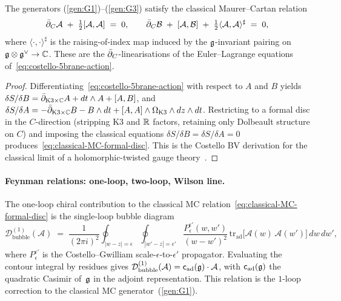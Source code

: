 \begin{proposition}
\label{prop:classical-MC-relations}
The generators
\textup{(\ref{gen:G1})--(\ref{gen:G3})} satisfy the classical
Maurer--Cartan relation
\begin{equation}
\label{eq:classical-MC-formal-disc}
\bar\partial_C \mathcal A
\;+\;
\tfrac12[\mathcal A,\mathcal A]
\;=\;
0,
\qquad
\bar\partial_C \mathcal B
\;+\;
[\mathcal A,\mathcal B]
\;+\;
\tfrac12\langle \mathcal A,\mathcal A\rangle^\sharp
\;=\;
0,
\end{equation}
where $\langle\cdot,\cdot\rangle^\sharp$ is the raising-of-index map
induced by the $\mathfrak g$-invariant pairing on $\mathfrak g\otimes\mathfrak g^\vee\to\mathbb C$.
These are the $\bar\partial_C$-linearisations of the Euler--Lagrange
equations of~\eqref{eq:costello-5brane-action}.
\end{proposition}

\begin{proof}[Proof]
Differentiating~\eqref{eq:costello-5brane-action} with respect to
$A$ and $B$ yields $\delta S/\delta B = \bar\partial_{\mathrm{K3}\times\mathbb C}A +
dt\wedge A + [A,B]$, and $\delta S/\delta A = -\bar\partial_{\mathrm{K3}\times\mathbb C}B
- B\wedge dt + [A,A]\wedge\Omega_{\mathrm{K3}}\wedge dz\wedge dt$.
Restricting to a formal disc in the $C$-direction (stripping K3 and
$\mathbb R$ factors, retaining only Dolbeault structure on $C$) and imposing
the classical equations $\delta S/\delta B = \delta S/\delta A = 0$
produces~\eqref{eq:classical-MC-formal-disc}. This is the Costello
BV derivation for the classical limit of a holomorphic-twisted gauge
theory~\cite[\S9]{costello-renormalization}.
\end{proof}

\paragraph{Feynman relations: one-loop, two-loop, Wilson line.}

\begin{proposition}
\label{prop:one-loop-bubble-relation}
The one-loop chiral contribution to the classical MC
relation~\eqref{eq:classical-MC-formal-disc} is the single-loop
bubble diagram
\begin{equation}
\label{eq:one-loop-bubble}
\mathcal D^{(1)}_{\mathrm{bubble}}(\mathcal A)
\;=\;
\frac{1}{(2\pi i)^2}
\oint_{|w-z|=\epsilon}
\oint_{|w'-z|=\epsilon'}
\frac{P_\epsilon^{\epsilon'}(w,w')}{(w-w')^2}\,
\mathrm{tr}_{\mathrm{ad}}\bigl[\mathcal A(w)\,\mathcal A(w')\bigr]\,
dw\,dw',
\end{equation}
where $P_\epsilon^{\epsilon'}$ is the Costello--Gwilliam
scale-$\epsilon$-to-$\epsilon'$ propagator. Evaluating the contour
integral by residues gives
$\mathcal D^{(1)}_{\mathrm{bubble}}(\mathcal A) =
\mathsf{c}_{\mathrm{ad}}(\mathfrak g)\cdot\mathcal A$, with
$\mathsf{c}_{\mathrm{ad}}(\mathfrak g)$ the quadratic Casimir of~$\mathfrak g$ in the
adjoint representation. This relation is the $1$-loop correction to the
classical MC generator~(\ref{gen:G1}).
\end{proposition}

